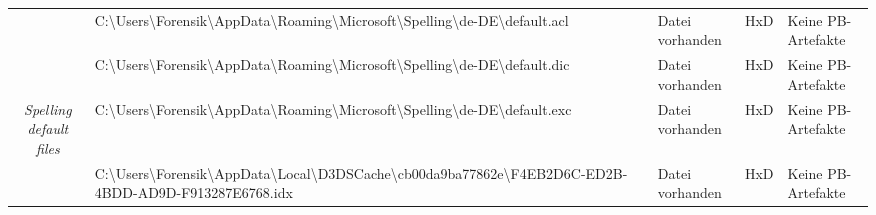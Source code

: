 \begin{appendices}
{\begin{landscape}
\begin{table}[h!]
{\begin{tabular}{cllll}
		\multicolumn{1}{|c|}{}                                                        & \multicolumn{1}{l|}{\cellcolor[HTML]{3190FF}C:\textbackslash{}Users\textbackslash{}Forensik\textbackslash{}AppData\textbackslash{}Roaming\textbackslash{}Microsoft\textbackslash{}Spelling\textbackslash{}de-DE\textbackslash{}default.acl}                                                                                                                                     & \multicolumn{1}{l|}{\cellcolor[HTML]{009901}Datei vorhanden}                                      & \multicolumn{1}{l|}{HxD}                                   & \multicolumn{1}{l|}{\cellcolor[HTML]{F8A102}Keine PB-Artefakte} \\ \cline{2-5} 
		\multicolumn{1}{|c|}{}                                                        & \multicolumn{1}{l|}{\cellcolor[HTML]{3190FF}C:\textbackslash{}Users\textbackslash{}Forensik\textbackslash{}AppData\textbackslash{}Roaming\textbackslash{}Microsoft\textbackslash{}Spelling\textbackslash{}de-DE\textbackslash{}default.dic}                                                                                                                                     & \multicolumn{1}{l|}{\cellcolor[HTML]{009901}Datei vorhanden}                                      & \multicolumn{1}{l|}{HxD}                                   & \multicolumn{1}{l|}{\cellcolor[HTML]{F8A102}Keine PB-Artefakte} \\ \cline{2-5} 
		\multicolumn{1}{|c|}{\multirow{-3}{*}{\textit{Spelling default files}}}       & \multicolumn{1}{l|}{\cellcolor[HTML]{3190FF}C:\textbackslash{}Users\textbackslash{}Forensik\textbackslash{}AppData\textbackslash{}Roaming\textbackslash{}Microsoft\textbackslash{}Spelling\textbackslash{}de-DE\textbackslash{}default.exc}                                                                                                                                     & \multicolumn{1}{l|}{\cellcolor[HTML]{009901}Datei vorhanden}                                      & \multicolumn{1}{l|}{HxD}                                   & \multicolumn{1}{l|}{\cellcolor[HTML]{F8A102}Keine PB-Artefakte} \\ \hline
		\multicolumn{1}{|c|}{}                                                        & \multicolumn{1}{l|}{\cellcolor[HTML]{3190FF}C:\textbackslash{}Users\textbackslash{}Forensik\textbackslash{}AppData\textbackslash{}Local\textbackslash{}D3DSCache\textbackslash{}cb00da9ba77862e\textbackslash{}F4EB2D6C-ED2B-4BDD-AD9D-F913287E6768.idx}                                                                                                                        & \multicolumn{1}{l|}{\cellcolor[HTML]{009901}Datei vorhanden}                                      & \multicolumn{1}{l|}{HxD}                                   & \multicolumn{1}{l|}{\cellcolor[HTML]{F8A102}Keine PB-Artefakte} \\ \cline{2-5} 

\end{tabular}}
\end{table}
\end{landscape}}
\end{appendices}
